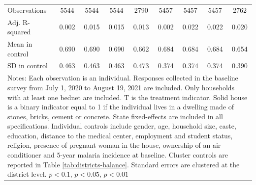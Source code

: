 {{\begin{tabular}{l*{8}{c}}
\hline
Observations    &\num{5544}         &\num{5544}         &\num{5544}         &\num{2790}         &\num{5457}         &\num{5457}         &\num{5457}         &\num{2762}         \\
Adj. R-squared  &    0.002         &    0.015         &    0.015         &    0.013         &    0.002         &    0.022         &    0.022         &    0.020         \\
Mean in control &    0.690         &    0.690         &    0.690         &    0.662         &    0.684         &    0.684         &    0.684         &    0.654         \\
SD in control   &    0.463         &    0.463         &    0.463         &    0.473         &    0.374         &    0.374         &    0.374         &    0.390         \\
\hline\hline
\multicolumn{9}{p{1.02\linewidth}}{\scriptsize Notes: Each observation is an individual. Responses collected in the baseline survey from July 1, 2020 to August 19, 2021 are included. Only households with at least one bednet are included. T is the treatment indicator. Solid house is a binary indicator equal to 1 if the individual lives in a dwelling made of stones, bricks, cement or concrete. State fixed-effects are included in all specifications. Individual controls include gender, age, household size, caste, education, distance to the medical center, employment and student status, religion, presence of pregnant woman in the house, ownership of an air conditioner and 5-year malaria incidence at baseline. Cluster controls are reported in Table \ref{tab:districts-balance}. Standard errors are clustered at the district level. \sym{*} \(p<0.1\), \sym{**} \(p<0.05\), \sym{***} \(p<0.01\)}\\
\end{tabular}
}%

}
